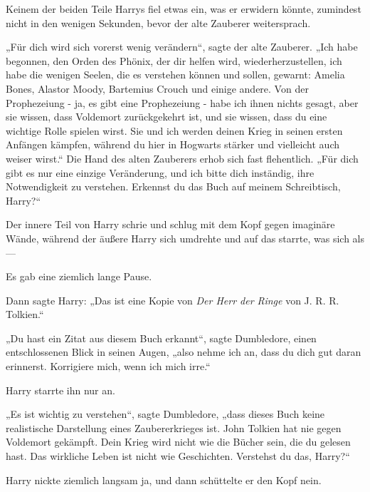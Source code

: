{Keinem der beiden Teile Harrys fiel etwas ein, was er erwidern könnte, zumindest nicht in den wenigen Sekunden, bevor der alte Zauberer weitersprach.

„Für dich wird sich vorerst wenig verändern“, sagte der alte Zauberer. „Ich habe begonnen, den Orden des Phönix, der dir helfen wird, wiederherzustellen, ich habe die wenigen Seelen, die es verstehen können und sollen, gewarnt: Amelia Bones, Alastor Moody, Bartemius Crouch und einige andere. Von der Prophezeiung - ja, es gibt eine Prophezeiung - habe ich ihnen nichts gesagt, aber sie wissen, dass Voldemort zurückgekehrt ist, und sie wissen, dass du eine wichtige Rolle spielen wirst. Sie und ich werden deinen Krieg in seinen ersten Anfängen kämpfen, während du hier in Hogwarts stärker und vielleicht auch weiser wirst.“ Die Hand des alten Zauberers erhob sich fast flehentlich. „Für dich gibt es nur eine einzige Veränderung, und ich bitte dich inständig, ihre Notwendigkeit zu verstehen. Erkennst du das Buch auf meinem Schreibtisch, Harry?“

Der innere Teil von Harry schrie und schlug mit dem Kopf gegen imaginäre Wände, während der äußere Harry sich umdrehte und auf das starrte, was sich als—

Es gab eine ziemlich lange Pause.

Dann sagte Harry: „Das ist eine Kopie von \emph{Der Herr der Ringe} von J. R. R. Tolkien.“

„Du hast ein Zitat aus diesem Buch erkannt“, sagte Dumbledore, einen entschlossenen Blick in seinen Augen, „also nehme ich an, dass du dich gut daran erinnerst. Korrigiere mich, wenn ich mich irre.“

Harry starrte ihn nur an.

„Es ist wichtig zu verstehen“, sagte Dumbledore, „dass dieses Buch keine realistische Darstellung eines Zaubererkrieges ist. John Tolkien hat nie gegen Voldemort gekämpft. Dein Krieg wird nicht wie die Bücher sein, die du gelesen hast. Das wirkliche Leben ist nicht wie Geschichten. Verstehst du das, Harry?“

Harry nickte ziemlich langsam ja, und dann schüttelte er den Kopf nein.

}
